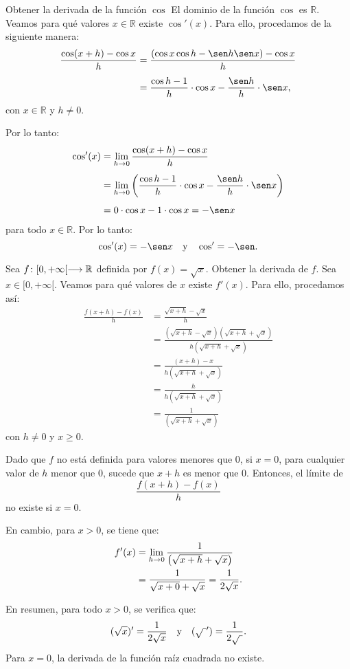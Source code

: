\begin{exemplo}[Solución]{%
Obtener la derivada de la función $\cos$
}%
El dominio de la función $\cos$ es $\mathbb{R}$. Veamos para qué valores $x \in\mathbb{R}$ existe
$\cos'(x)$. Para ello, procedamos de la siguiente manera:
\begin{align*}
\frac{\cos(x + h) - \cos x}{h} &= \frac{(\cos x\cos h - \sen h\sen x) - \cos x}{h} \\[4pt]
  &= \frac{\cos h - 1}{h}\cdot\cos x - \frac{\sen h}{h}\cdot\sen x,
\end{align*}
con $x\in\mathbb{R}$ y $h\neq 0$.

Por lo tanto:
\begin{align*}
\cos'(x) &= \limjc{\frac{\cos(x + h) - \cos x}{h}}{h}{0} \\[4pt]
  &= \limjc{\left(\frac{\cos h -1}{h}\cdot\cos x - \frac{\sen h}{h}\cdot\sen x\right)}{h}{0} \\[4pt]
  &= 0\cdot\cos x - 1\cdot\cos x = -\sen x
\end{align*}
para todo $x\in\mathbb{R}$. Por lo tanto:
\[
\cos'(x) = -\sen x \yjc \cos' = -\sen.
\]
\end{exemplo}

\begin{exemplo}[Solución]{%
Sea $\funcjc{f}{[0,+\infty[}{\Rbb}$ definida por $f(x) = \sqrt{x}$. Obtener la derivada de $f$.
}%
Sea $x \in [0,+\infty[$. Veamos para qué valores de $x$ existe $f'(x)$. Para ello, procedamos así:
\begin{align*}
\frac{f(x + h) - f(x)}{h} &= \frac{\sqrt{x + h} - \sqrt{x}}{h} \\
  &= \frac{\left(\sqrt{x + h} - \sqrt{x}\right)\left(\sqrt{x + h} + \sqrt{x}\right)}%
      {h\left(\sqrt{x + h} + \sqrt{x}\right)} \\
  &= \frac{(x + h) - x}{h\left(\sqrt{x + h} + \sqrt{x}\right)} \\
  &= \frac{h}{h\left(\sqrt{x + h} + \sqrt{x}\right)} \\
  &= \frac{1}{\left(\sqrt{x + h} + \sqrt{x}\right)}
\end{align*}
con $h \neq 0$ y $x \geq 0$.

Dado que $f$ no está definida para valores menores que $0$, si $x = 0$, para cualquier valor de $h$
menor que $0$, sucede que $x + h$ es menor que $0$. Entonces, el límite de
\[
\frac{f(x + h) - f(x)}{h}
\]
no existe si $x = 0$.

En cambio, para $x > 0$, se tiene que:
\begin{align*}
f'(x) &= \limjc{\frac{1}{\left(\sqrt{x + h} + \sqrt{x}\right)}}{h}{0} \\
    &= \frac{1}{\sqrt{x + 0} + \sqrt{x}} = \frac{1}{2\sqrt{x}}.
\end{align*}

En resumen, para todo $x > 0$, se verifica que:
\[
(\sqrt{x})' = \frac{1}{2\sqrt{x}} \yjc (\sqrt{\ }') = \frac{1}{2\sqrt{\ }}.
\]
Para $x = 0$, la derivada de la función raíz cuadrada no existe.
\end{exemplo}

